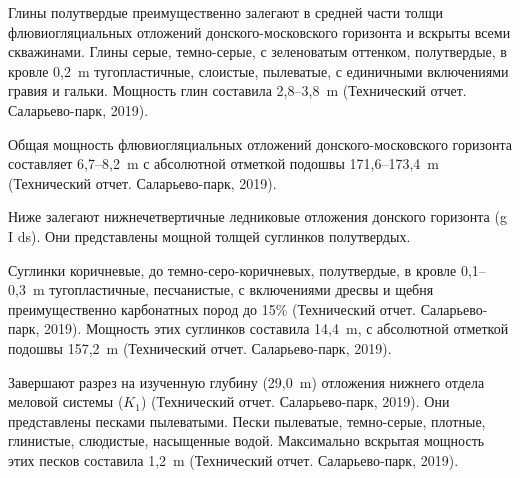 Глины полутвердые преимущественно залегают в средней части толщи флювиогляциальных 
отложений донского-московского горизонта и вскрыты всеми скважинами.
Глины серые, темно-серые, с зеленоватым оттенком, полутвердые, 
в кровле 0,2~\si{\meter} тугопластичные, слоистые, пылеватые, 
с единичными включениями гравия и гальки. 
Мощность глин составила 2,8--3,8~\si{\meter} (Технический отчет. Саларьево-парк, 2019).

Общая мощность флювиогляциальных отложений донского-московского горизонта 
составляет 6,7--8,2~\si{\meter} с абсолютной отметкой подошвы 
171,6--173,4~\si{\meter} (Технический отчет. Саларьево-парк, 2019).

Ниже залегают нижнечетвертичные ледниковые отложения донского горизонта (g I ds). 
Они представлены мощной толщей суглинков полутвердых.

Суглинки коричневые, до темно-серо-коричневых, полутвердые, 
в кровле 0,1--0,3~\si{\meter} тугопластичные, песчанистые, 
с включениями дресвы и щебня преимущественно карбонатных 
пород до 15\% (Технический отчет. Саларьево-парк, 2019). 
Мощность этих суглинков составила 14,4~\si{\meter}, 
с абсолютной отметкой подошвы 157,2~\si{\meter} (Технический отчет. Саларьево-парк, 2019).

Завершают разрез на изученную глубину (29,0~\si{\meter}) отложения 
нижнего отдела меловой системы ($K_1$) (Технический отчет. Саларьево-парк, 2019). 
Они представлены песками пылеватыми. Пески пылеватые, темно-серые, 
плотные, глинистые, слюдистые, насыщенные водой. 
Максимально вскрытая мощность этих песков 
составила 1,2~\si{\meter} (Технический отчет. Саларьево-парк, 2019).
